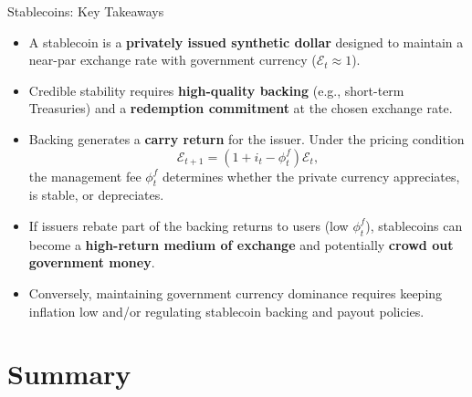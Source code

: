 \documentclass[11pt,aspectratio=169]{beamer}
\begin{document}
\begin{frame}{Stablecoins: Key Takeaways}
\small
\begin{itemize}

    \item A stablecoin is a \textbf{privately issued synthetic dollar} designed to maintain a near-par exchange rate with government currency ($\mathcal{E}_t \approx 1$).

    \vspace{0.3em}

    \item Credible stability requires \textbf{high-quality backing} (e.g., short-term Treasuries) and a \textbf{redemption commitment} at the chosen exchange rate.

    \vspace{0.3em}

    \item Backing generates a \textbf{carry return} for the issuer. Under the pricing condition
    \[
        \mathcal{E}_{t+1}=(1+i_t-\phi_t^f)\mathcal{E}_t,
    \]
    the management fee $\phi_t^f$ determines whether the private currency appreciates, is stable, or depreciates.

    \vspace{0.3em}

    \item If issuers rebate part of the backing returns to users (low $\phi_t^f$), stablecoins can become a \textbf{high-return medium of exchange} and potentially \textbf{crowd out government money}.

    \vspace{0.3em}

    \item Conversely, maintaining government currency dominance requires keeping inflation low and/or regulating stablecoin backing and payout policies.

\end{itemize}
\end{frame}


\section{Summary}
\end{document}
